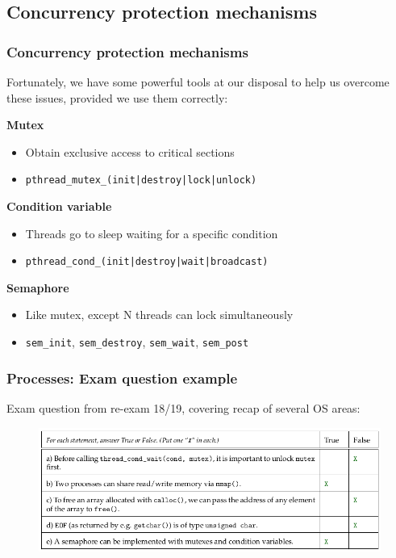 \documentclass[xcolor={usenames,dvipsnames}]{beamer}
\begin{document}
%
%
%
\begin{frame}
\section{Concurrency protection mechanisms}
\frametitle{Concurrency protection mechanisms}
Fortunately, we have some powerful tools at our disposal to help us
overcome these issues, provided we use them correctly:\\\vspace{3mm}

\textbf{Mutex}
\begin{itemize}
\item Obtain exclusive access to critical sections
\item \texttt{pthread\_mutex\_(init|destroy|lock|unlock)}
\end{itemize}

\textbf{Condition variable}
\begin{itemize}
\item Threads go to sleep waiting for a specific condition
\item \texttt{pthread\_cond\_(init|destroy|wait|broadcast)}
\end{itemize}

\textbf{Semaphore}
\begin{itemize}
\item Like mutex, except N threads can lock simultaneously
\item \texttt{sem\_init}, \texttt{sem\_destroy}, \texttt{sem\_wait}, \texttt{sem\_post}
\end{itemize}

\end{frame}



%
%
%
\begin{frame}
\frametitle{Processes: Exam question example}
Exam question from re-exam 18/19, covering recap of several OS areas:

\begin{figure}
\includegraphics[width=1.0\textwidth]{images/exam_question_2_recap.png}
\end{figure}

\end{frame}
\end{document}
